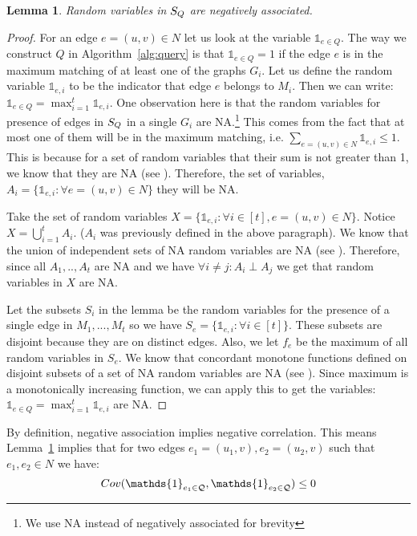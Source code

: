 \documentclass[letterpaper,11pt]{article}
\newcommand{\SX}{\ensuremath{X}\xspace}
\newtheorem{lemma}{Lemma}[section]
\begin{document}
\begin{lemma}\label{lem:NA_Q}
Random variables in $S_Q$ are negatively associated. 
\end{lemma}
\begin{proof}

For an edge $e = (u, v) \in N$ let us look at the variable $\mathds{1}_{e \in Q}$. The way we construct $Q$ in Algorithm~\ref{alg:query} is that $\mathds{1}_{e \in Q} = 1$ if the edge $e$ is in the maximum matching of at least one of the graphs $G_i$. Let us define the random variable $\mathds{1}_{e, i}$ to be the indicator that edge $e$ belongs to $M_i$. Then we can write:
$\mathds{1}_{e \in Q} = \max_ {i = 1}^t \mathds{1}_{e, i}$. One observation here is that the random variables for presence of edges in $S_Q$ in a single $G_i$ are NA.\footnote{We use NA instead of negatively associated for brevity} This comes from the fact that at most one of them will be in the maximum matching, i.e. $\sum_{e = (u, v) \in N} \mathds{1}_{e, i} \leq 1$. 
This is because for a set of random variables that their sum is not greater than 1, we know that they are NA (see \cite{dubhashi1996balls}). Therefore, the set of variables, 
$A_i = \{ \mathds{1}_{e, i} : \forall e = (u, v) \in N \}$
they will be NA. 

Take the set of random variables
$
\SX = 
\{
\mathds{1}_{e, i} : \forall i \in [t], e = (u, v) \in N
\}
$. Notice $\SX = \bigcup_{i = 1}^t A_i$. ($A_i$ was previously defined in the above paragraph). We know that the union of independent sets of NA random variables are NA (see \cite{khursheed1981positive}). Therefore, since all $A_1, .., A_t$ are NA and we have $\forall i \neq j: A_i \perp A_j$ we get that random variables in $\SX$ are NA.

Let the subsets $S_i$ in the lemma be the random variables for the presence of a single edge in 
$M_1, ..., M_t$ so we have $S_e = \{ \mathds{1}_{e, i} : \forall i \in [t] \}$. These subsets are disjoint because they are on distinct edges. Also, we let $f_e$ be the maximum of all random variables in $S_e$. We know that concordant monotone functions defined on disjoint subsets of a set of NA random variables are NA (see \cite{khursheed1981positive}). Since maximum is a monotonically increasing function, we can apply this  to get the variables: 
$ \mathds{1}_{e \in Q} = \max_{i = 1}^t \mathds{1}_{e, i}
$ are NA. 
\end{proof}

By definition, negative association implies negative correlation. This means Lemma~\ref{lem:NA_Q} implies that for two edges $e_1 = (u_1, v), e_2 = (u_2, v)$ such that $e_1, e_2 \in N$ we have: 
\begin{equation}\label{eq:negyjhwekj}
    \Cov(\mathds{1}_{e_1 \in \qstar}, \mathds{1}_{e_2 \in \qstar}) \leq 0
\end{equation}
\end{document}
